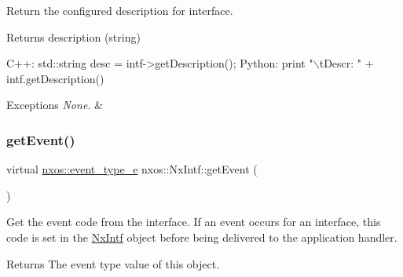 Return the configured description for interface.

\begin{DoxyReturn}{Returns}
description (string)
\end{DoxyReturn}

\begin{DoxyCode}
C++:
       std::string desc = intf->getDescription();
Python:
       print \textcolor{stringliteral}{"\(\backslash\)tDescr: "} + intf.getDescription()
\end{DoxyCode}



\begin{DoxyExceptions}{Exceptions}
{\em None.} & \\
\hline
\end{DoxyExceptions}
\mbox{\label{classnxos_1_1_nx_intf_a148d8b41d613478294179277a03f3aeb}} 
\subsubsection{\texorpdfstring{get\+Event()}{getEvent()}}
{\footnotesize\ttfamily virtual \mbox{\hyperlink{namespacenxos_af9a9040b7681199d386e94eb888018cb}{nxos\+::event\+\_\+type\+\_\+e}} nxos\+::\+Nx\+Intf\+::get\+Event (\begin{DoxyParamCaption}{ }\end{DoxyParamCaption})\hspace{0.3cm}{\ttfamily [pure virtual]}}

Get the event code from the interface. If an event occurs for an interface, this code is set in the \mbox{\hyperlink{classnxos_1_1_nx_intf}{Nx\+Intf}} object before being delivered to the application handler.

\begin{DoxyReturn}{Returns}
The event type value of this object.
\end{DoxyReturn}

